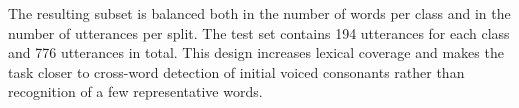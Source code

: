 The resulting subset is balanced both in the number of words per class and in the number of utterances per split. The test set contains 194 utterances for each class and 776 utterances in total. This design increases lexical coverage and makes the task closer to cross-word detection of initial voiced consonants rather than recognition of a few representative words.
